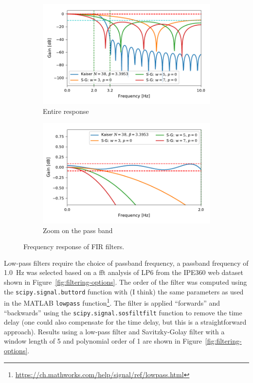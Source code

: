 \documentclass[a4paper,11pt]{article}
\begin{document}
\begin{figure}
    \centering
    \begin{subfigure}{\textwidth}
        \includegraphics{kaiser_win_freq-response.pdf}
        \caption{Entire response}
    \end{subfigure}

    \begin{subfigure}{\textwidth}
        \includegraphics{kaiser_win_freq-response_zoom.pdf}
        \caption{Zoom on the pass band}
    \end{subfigure}
    \caption{Frequency response of FIR filters.}
    \label{fig:filter-freq-response}
\end{figure}


Low-pass filters require the choice of passband frequency, a passband frequency of 1.0~Hz was selected based on a fft analysis of LP6 from the IPE360 web dataset shown in Figure~\ref{fig:filtering-options}.
The order of the filter was computed using the \texttt{scipy.signal.buttord} function with (I think) the same parameters as used in the MATLAB \texttt{lowpass} function\footnote{\url{https://ch.mathworks.com/help/signal/ref/lowpass.html}}.
The filter is applied ``forwards'' and ``backwards'' using the \texttt{scipy.signal.sosfiltfilt} function to remove the time delay (one could also compensate for the time delay, but this is a straightforward approach).
Results using a low-pass filter and Savitzky-Golay filter with a window length of 5 and polynomial order of 1 are shown in Figure~\ref{fig:filtering-options}.
\end{document}
